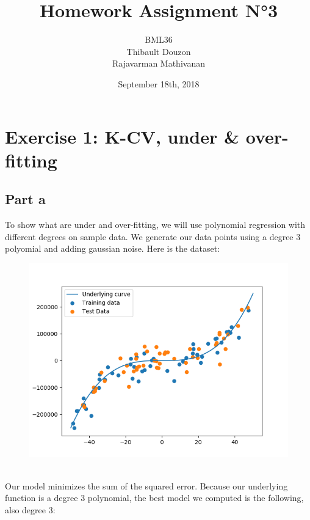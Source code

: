 \documentclass[a4paper, 10pt]{article}
\title{Homework Assignment N°3}
\author{BML36\\Thibault Douzon\\Rajavarman Mathivanan}
\date{September 18th, 2018}
\begin{document}
\maketitle

\pagebreak

\tableofcontents

\pagebreak

\section{Exercise 1: K-CV, under \& over-fitting}

\subsection{Part a}
To show what are under and over-fitting, we will use polynomial 
regression with different degrees on sample data. We generate 
our data points using a degree 3 polyomial and adding gaussian noise. Here is the dataset:
\\
\begin{figure}
\centering
	\includegraphics[scale=0.7]{ex1a_curve}
\end{figure}
\\
Our model minimizes the sum of the squared error. Because our underlying function is a degree 3
polynomial, the best model we computed is the following, also degree 3:
\\
\end{document}
